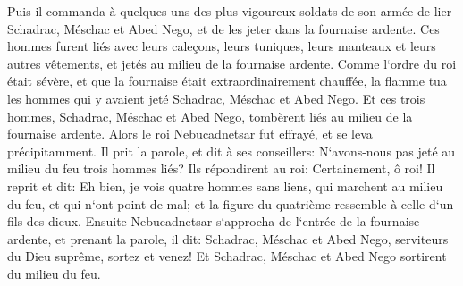 \verse Puis il commanda à quelques-uns des plus vigoureux soldats de son armée de lier Schadrac, Méschac et Abed Nego, et de les jeter dans la fournaise ardente. 
\verse Ces hommes furent liés avec leurs caleçons, leurs tuniques, leurs manteaux et leurs autres vêtements, et jetés au milieu de la fournaise ardente. 
\verse Comme l`ordre du roi était sévère, et que la fournaise était extraordinairement chauffée, la flamme tua les hommes qui y avaient jeté Schadrac, Méschac et Abed Nego. 
\verse Et ces trois hommes, Schadrac, Méschac et Abed Nego, tombèrent liés au milieu de la fournaise ardente. 
\verse Alors le roi Nebucadnetsar fut effrayé, et se leva précipitamment. Il prit la parole, et dit à ses conseillers: N`avons-nous pas jeté au milieu du feu trois hommes liés? Ils répondirent au roi: Certainement, ô roi! 
\verse Il reprit et dit: Eh bien, je vois quatre hommes sans liens, qui marchent au milieu du feu, et qui n`ont point de mal; et la figure du quatrième ressemble à celle d`un fils des dieux. 
\verse Ensuite Nebucadnetsar s`approcha de l`entrée de la fournaise ardente, et prenant la parole, il dit: Schadrac, Méschac et Abed Nego, serviteurs du Dieu suprême, sortez et venez! Et Schadrac, Méschac et Abed Nego sortirent du milieu du feu. 
